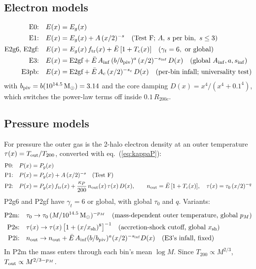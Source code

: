 \documentclass[10pt,a4paper]{article}
\newcommand{\Rc}{R_{200c}}
\newcommand{\ftr}{f_{\rm tr}}
\begin{document}
\subsection{Electron models}\label{sec:emodels}
\begin{align}
\text{E0:}\quad & E(x)=E_g(x)\\
\text{E1:}\quad & E(x)=E_g(x)+A\,(x/2)^{-s}\quad(\text{Test F; }A,\,s\text{ per bin},\ s\le3)\\
\text{E2g6, E2gf:}\quad & E(x)=E_g(x)\,\ftr(x)+\bar E\,[1+T_c(x)]\quad(\gamma_t=6,\text{ or global})\label{eq:E2}\\
\text{E3:}\quad & E(x)=\text{E2gf}+\bar E\,A_{\rm inf}\,(b/b_{\rm piv})^{a}\,(x/2)^{-s_{\rm inf}}\,D(x)\quad(\text{global }A_{\rm inf},a,s_{\rm inf})\\
\text{E3pb:}\quad & E(x)=\text{E2gf}+\bar E\,A_c\,(x/2)^{-s_c}\,D(x)\quad(\text{per-bin infall; universality test})
\end{align}
with $b_{\rm piv}=b(10^{14.5}\,{\rm M}_\odot)=3.14$ and the core damping $D(x)=x^4/(x^4+0.1^4)$, which switches the
power-law terms off inside $0.1\,\Rc$.

\subsection{Pressure models}\label{sec:pmodels}
For pressure the outer gas is the 2-halo electron density at an outer temperature $\tau(x)=T_{\rm out}/T_{200}$, converted
with eq.~(\ref{eq:kappaP}):
\begin{align}
\text{P0:}\quad & P(x)=P_g(x)\\
\text{P1:}\quad & P(x)=P_g(x)+A\,(x/2)^{-s}\quad(\text{Test F})\\
\text{P2:}\quad & P(x)=P_g(x)\,\ftr(x)+\frac{\kappa_P}{200}\,n_{\rm out}(x)\,\tau(x)\,D(x),\qquad n_{\rm out}=\bar E\,[1+T_c(x)],\quad
\tau(x)=\tau_0\,(x/2)^{-q} \label{eq:P2}
\end{align}
P2g6 and P2gf have $\gamma_t=6$ or global, with global $\tau_0$ and $q$. Variants:
\begin{align}
\text{P2m:}\quad & \tau_0\to\tau_0\,(M/10^{14.5}\,{\rm M}_\odot)^{-p_M}\quad(\text{mass-dependent outer temperature, global }p_M)\label{eq:P2m}\\
\text{P2s:}\quad & \tau(x)\to\tau(x)\,\bigl[1+(x/x_{\rm sh})^8\bigr]^{-1}\quad(\text{accretion-shock cutoff, global }x_{\rm sh})\\
\text{P2i:}\quad & n_{\rm out}\to n_{\rm out}+\bar E\,A_{\rm inf}(b/b_{\rm piv})^{a}(x/2)^{-s_{\rm inf}}D(x)\quad(\text{E3's infall, fixed})
\end{align}
In P2m the mass enters through each bin's mean $\log M$. Since $T_{200}\propto M^{2/3}$, $T_{\rm out}\propto M^{2/3-p_M}$.
\end{document}
